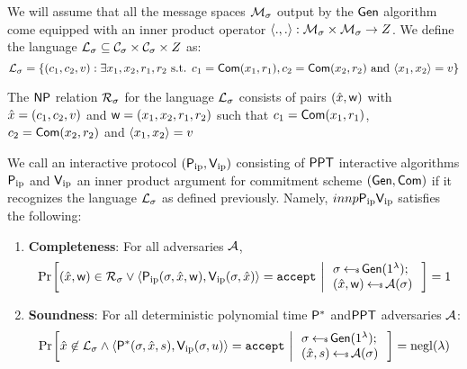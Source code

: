 We will assume that all the message spaces $\mathcal{M}_\sigma$ output by the $\mathsf{Gen}$ algorithm come equipped with an inner product operator $\langle .,.\rangle:\mathcal{M}_\sigma\times \mathcal{M}_\sigma\rightarrow Z$. We define the language $\mathcal{L}_\sigma\subseteq \mathcal{C}_\sigma\times \mathcal{C}_\sigma\times Z$ as:
\begin{equation*}
\mathcal{L}_\sigma = \{(c_1,c_2,v):\exists x_1,x_2,r_1,r_2 \text{ s.t. }
c_1=\mathsf{Com}(x_1,r_1), c_2=\mathsf{Com}(x_2,r_2) \text{ and } \langle x_1,x_2\rangle=v\} 
\end{equation*}

The $\mathsf{NP}$ relation $\mathcal{R}_\sigma$ for the language $\mathcal{L}_\sigma$ consists of pairs $(\hat{x},\mathsf{w})$ with $\hat{x}=(c_1,c_2,v)$ and $\mathsf{w}=(x_1,x_2,r_1,r_2)$ such that $c_1=\mathsf{Com}(x_1,r_1)$, $c_2=\mathsf{Com}(x_2,r_2)$ and $\langle x_1,x_2\rangle=v$ 

\begin{definition}\label{defn:innerproductarg}
We call an interactive protocol $(\mathsf{P}_\mathrm{ip},\mathsf{V}_\mathrm{ip})$ consisting of $\mathsf{PPT}$ interactive algorithms $\mathsf{P}_\mathrm{ip}$ and $\mathsf{V}_\mathrm{ip}$ an inner product argument for commitment scheme $(\mathsf{Gen},\mathsf{Com})$ if it recognizes the language $\mathcal{L}_\sigma$ as defined previously. Namely, $innp{\mathsf{P}_\mathrm{ip}}{\mathsf{V}_\mathrm{ip}}$ satisfies the following:
\begin{enumerate}[{\rm (i)}]
\item {\bf Completeness}: For all adversaries $\mathcal{A}$,
\begin{align*}
\condprob{(\stmt,\wit)\in \calR_\sigma \vee \langle \pip(\sigma,\stmt,\wit),\vip(\sigma,\stmt)\rangle={\tt accept}}{
\begin{array}{l}
\sigma\sample \gen(\secparam);\\
(\stmt,\wit)\sample \adv(\sigma)
\end{array}
}=1
\end{align*}

\item{\bf Soundness}: For all deterministic polynomial time $\mathsf{P}^*$ and$\mathsf{PPT}$ adversaries $\mathcal{A}$:
\begin{align*}
\condprob{\stmt\not\in \calL_\sigma \wedge \langle
\prover^*(\sigma,\stmt,s),\vip(\sigma,u)\rangle={\tt accept}}{
\begin{array}{l}
\sigma\sample \gen(\secparam);\\
(\stmt,s)\sample \adv(\sigma)
\end{array}
} = \negl(\lambda)
\end{align*}
\end{enumerate}
\end{definition}


